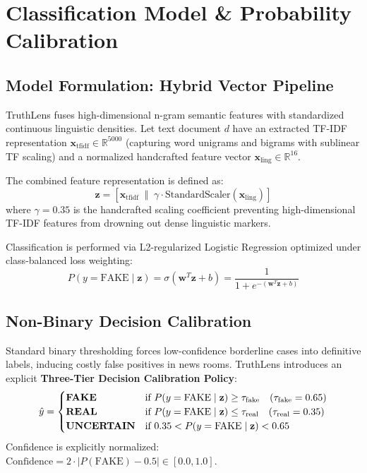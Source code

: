 \documentclass[11pt,a4paper]{article}
\begin{document}
\section{Classification Model \& Probability Calibration}

\subsection{Model Formulation: Hybrid Vector Pipeline}
TruthLens fuses high-dimensional n-gram semantic features with standardized continuous linguistic densities. Let text document $d$ have an extracted TF-IDF representation $\mathbf{x}_{\text{tfidf}} \in \mathbb{R}^{5000}$ (capturing word unigrams and bigrams with sublinear TF scaling) and a normalized handcrafted feature vector $\mathbf{x}_{\text{ling}} \in \mathbb{R}^{16}$. 

The combined feature representation is defined as:
\begin{equation}
\mathbf{z} = \left[ \mathbf{x}_{\text{tfidf}} \;\; \Vert \;\; \gamma \cdot \text{StandardScaler}(\mathbf{x}_{\text{ling}}) \right]
\end{equation}
where $\gamma = 0.35$ is the handcrafted scaling coefficient preventing high-dimensional TF-IDF features from drowning out dense linguistic markers.

Classification is performed via L2-regularized Logistic Regression optimized under class-balanced loss weighting:
\begin{equation}
P(y = \text{FAKE} \mid \mathbf{z}) = \sigma(\mathbf{w}^T \mathbf{z} + b) = \frac{1}{1 + e^{-(\mathbf{w}^T \mathbf{z} + b)}}
\end{equation}

\subsection{Non-Binary Decision Calibration}
Standard binary thresholding forces low-confidence borderline cases into definitive labels, inducing costly false positives in news rooms. TruthLens introduces an explicit \textbf{Three-Tier Decision Calibration Policy}:
\begin{equation}
\hat{y} = 
\begin{cases}
\text{\textbf{FAKE}} & \text{if } P(y = \text{FAKE} \mid \mathbf{z}) \ge \tau_{\text{fake}} \quad (\tau_{\text{fake}} = 0.65) \\
\text{\textbf{REAL}} & \text{if } P(y = \text{FAKE} \mid \mathbf{z}) \le \tau_{\text{real}} \quad (\tau_{\text{real}} = 0.35) \\
\text{\textbf{UNCERTAIN}} & \text{if } 0.35 < P(y = \text{FAKE} \mid \mathbf{z}) < 0.65
\end{cases}
\end{equation}
Confidence is explicitly normalized: $\text{Confidence} = 2 \cdot |P(\text{FAKE}) - 0.5| \in [0.0, 1.0]$.
\end{document}
